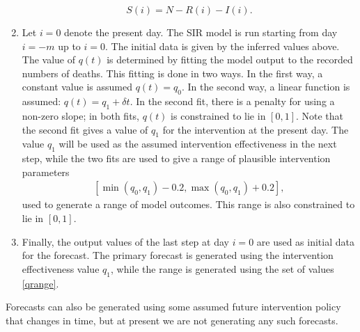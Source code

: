 \documentclass[english,12pt,letter]{article}
\begin{document}
\begin{enumerate}
$$                S(i) = N - R(i) - I(i).
            $$
    \item   Let $i=0$ denote the present day.  The SIR model is run starting from day $i=-m$
            up to $i=0$.  The initial data is given by the inferred values above.
            The value of $q(t)$ is determined by fitting the model output to the recorded numbers
            of deaths.  This fitting is done in two ways.  In the first way, a constant value is assumed
            $q(t)=q_0$.  In the second way, a linear function is assumed: $q(t) = q_1 + \delta t$.
            In the second fit, there is a penalty for using a non-zero slope; in both fits,
            $q(t)$ is constrained to lie in $[0,1]$.  Note that the second fit gives a value
            of $q_1$ for the intervention at the present day.  The value $q_1$ will be used as the
            assumed intervention effectiveness in the next step, while the two fits are used
            to give a range of plausible intervention parameters 
            \begin{align} \label{qrange}
                [\min(q_0,q_1)-0.2, \max(q_0,q_1)+0.2],
            \end{align}
            used to generate a range of model outcomes.  This range is also constrained to lie in $[0,1]$.
    \item   Finally, the output values of the last step at day $i=0$ are used as initial data for the forecast.
            The primary forecast is generated using the intervention effectiveness value $q_1$, while
            the range is generated using the set of values \eqref{qrange}.
\end{enumerate}
Forecasts can also be generated using some assumed future intervention policy that changes in time,
but at present we are not generating any such forecasts.
\end{document}

